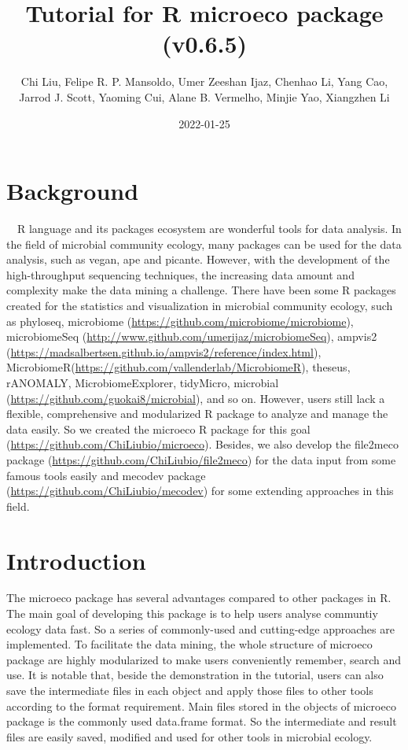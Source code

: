 \documentclass[
]{book}
\title{Tutorial for R microeco package (v0.6.5)}
\author{Chi Liu, Felipe R. P. Mansoldo, Umer Zeeshan Ijaz, Chenhao Li, Yang Cao, Jarrod J. Scott, Yaoming Cui, Alane B. Vermelho, Minjie Yao, Xiangzhen Li}
\date{2022-01-25}
\begin{document}
\maketitle

{
\setcounter{tocdepth}{1}
\tableofcontents
}
\hypertarget{background}{%
\chapter{Background}\label{background}}

　R language \citep{R-base} and its packages ecosystem are wonderful tools for data analysis.
In the field of microbial community ecology, many packages can be used for the data analysis,
such as vegan\citep{Jari_vegan_2019}, ape\citep{Paradis_ape_2018} and picante\citep{Picante_Kembel_2010}.
However, with the development of the high-throughput sequencing techniques,
the increasing data amount and complexity make the data mining a challenge.
There have been some R packages created for the statistics and visualization in microbial community ecology,
such as phyloseq\citep{Mcmurdie_phyloseq_2013},
microbiome (\url{https://github.com/microbiome/microbiome}), microbiomeSeq (\url{http://www.github.com/umerijaz/microbiomeSeq}),
ampvis2 (\url{https://madsalbertsen.github.io/ampvis2/reference/index.html}), MicrobiomeR(\url{https://github.com/vallenderlab/MicrobiomeR}),
theseus\citep{Price_theseus_2018}, rANOMALY\citep{Theil_rANOMALY_2021},
MicrobiomeExplorer\citep{Reeder_MicrobiomeExplorer_2021},
tidyMicro\citep{Carpenter_tidyMicro_2021}, microbial (\url{https://github.com/guokai8/microbial}),
and so on.
However, users still lack a flexible, comprehensive and modularized R package to analyze and manage the data easily.
So we created the microeco R package\citep{Liu_microeco_2021} for this goal (\url{https://github.com/ChiLiubio/microeco}).
Besides, we also develop the file2meco package (\url{https://github.com/ChiLiubio/file2meco}) for the data input from some famous tools easily
and mecodev package (\url{https://github.com/ChiLiubio/mecodev}) for some extending approaches in this field.

\hypertarget{intro}{%
\chapter{Introduction}\label{intro}}

The microeco package has several advantages compared to other packages in R.
The main goal of developing this package is to help users analyse communtiy ecology data fast.
So a series of commonly-used and cutting-edge approaches are implemented.
To facilitate the data mining, the whole structure of microeco package are highly modularized to
make users conveniently remember, search and use.
It is notable that, beside the demonstration in the tutorial, users can also save the intermediate files in each object and
apply those files to other tools according to the format requirement.
Main files stored in the objects of microeco package is the commonly used data.frame format.
So the intermediate and result files are easily saved, modified and used for other tools in microbial ecology.
\end{document}
